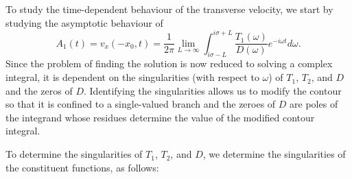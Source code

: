 To study the time-dependent behaviour of the transverse velocity, we start by studying the asymptotic behaviour of
\begin{equation}
A_1(t) = v_x(-x_0, t) = \frac{1}{2\pi} \lim_{L \to \infty} \int_{i\sigma - L}^{i\sigma + L} \frac{T_1(\omega)}{D(\omega)} e^{-i\omega t} d\omega.
\label{A inv laplace}
\end{equation}
Since the problem of finding the solution is now reduced to solving a complex integral, it is dependent on the singularities (with respect to $\omega$) of $T_1$, $T_2$, and $D$ and the zeros of $D$. Identifying the singularities allows us to modify the contour so that it is confined to a single-valued branch and the zeroes of $D$ are poles of the integrand whose residues determine the value of the modified contour integral.

To determine the singularities of  $T_1$, $T_2$, and $D$, we determine the singularities of the constituent functions, as follows:
